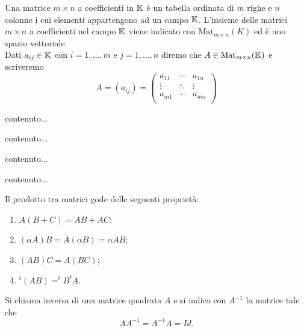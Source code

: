 
\begin{definition}[Matrice]
	Una matrice $ m \times n $ a coefficienti in $ \mathbb{K} $ è un tabella ordinata di $ m $ righe e $ n $ colonne i cui elementi appartengono ad un campo $ \mathbb{K} $. L'insieme delle matrici $ m \times n $ a coefficienti nel campo $ \mathbb{K} $ viene indicato con $ \mathrm{Mat}_{m \times n}{(K)} $ ed è uno spazio vettoriale. \\ Dati $ a_{ij} \in \mathbb{K} $ con $ i = 1, \ldots, m $ e $ j = 1, \ldots, n $ diremo che $ A \in \mathrm{Mat}_{m \times n} (\mathbb{K}) $ e scriveremo
	\[ A = (a_{ij}) =
	\begin{pmatrix}
		a_{11} & \cdots  & a_{1n} \\
		\vdots & \ddots & \vdots \\
		a_{m1} & \cdots  & a_{mn} \\
	\end{pmatrix}\]
\end{definition}

\begin{definition}
	contenuto...
\end{definition}

\begin{definition}
	contenuto...
\end{definition}

\begin{propriety}
	contenuto...
\end{propriety}

\begin{definition}
	contenuto...
\end{definition}

\begin{propriety}
	Il prodotto tra matrici gode delle seguenti proprietà:
	\begin{enumerate}[label=(\roman*)]
		\item $ A(B+C) = AB + AC $;
		\item $ (\alpha A)B = A(\alpha B) = \alpha AB $;
		\item $ (AB)C = A(BC) $;
		\item $ ^t(AB) = ^tB^tA $. %
	\end{enumerate}
\end{propriety}

\begin{definition}
	Si chiama inversa di una matrice quadrata $A$ e si indica con $A^{-1}$ la matrice tale che
	\[AA^{-1}=A^{-1}A=Id.\]	
\end{definition}

